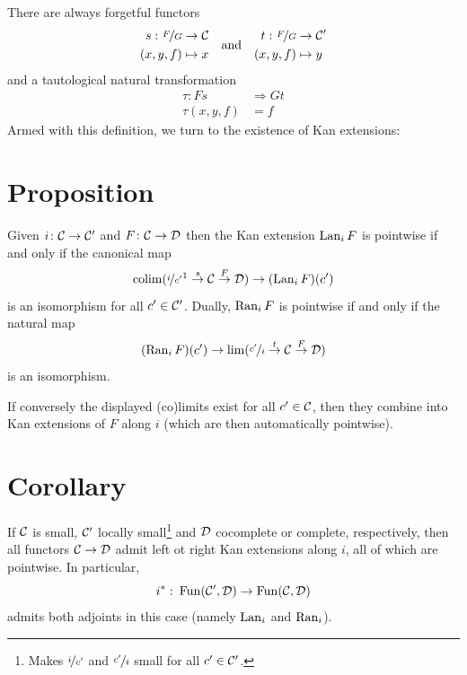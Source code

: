         There are always forgetful functors
        \begin{equation*}
            \begin{alignedat}{1}
                s \,\colon \nicefrac{F}{G} &\to \mathcal{C} \\
                (x,y,f) &\mapsto x
            \end{alignedat}
            \quad \text{and} \quad
            \begin{alignedat}{1}
                t \,\colon \nicefrac{F}{G} &\to \mathcal{C}' \\
                (x,y,f) &\mapsto y
            \end{alignedat}
        \end{equation*}
        and a tautological natural transformation
        \begin{equation*}
            \begin{alignedat}{1}
                \tau \colon Fs &\Rightarrow Gt \\
                \tau(x,y,f) &= f 
            \end{alignedat}
        \end{equation*}
        Armed with this definition, we turn to the existence of Kan extensions:
    \section{Proposition}\label{chI-44}
        Given $i \colon \mathcal{C} \to \mathcal{C}'$ and $F \colon \mathcal{C} \to \mathcal{D}$ then the Kan extension $\operatorname{Lan}_i F$ is pointwise if and only if the canonical map
        \begin{equation*}
            \colim(\nicefrac{i}{c'}\footnotemark \overset{s}{\rightarrow} \Cc \overset{F}{\rightarrow} \Dd) \to (\Lan_i F)(c')
        \end{equation*}
        is an isomorphism for all $c' \in \mathcal{C}'$. Dually, $\operatorname{Ran}_i F$ is pointwise if and only if the natural map
        \begin{equation*}
            (\operatorname{Ran}_i F)(c') \to \lim(\nicefrac{c'}{i} \overset{t}{\rightarrow} \mathcal{C} \overset{F}{\rightarrow} \mathcal{D})
        \end{equation*}
        is an isomorphism.

        If conversely the displayed (co)limits exist for all $c' \in \mathcal{C}$, then they combine into Kan extensions of $F$ along $i$ (which are then automatically pointwise).
    \section{Corollary}\label{chI-45}
        If $\mathcal{C}$ is small, $\mathcal{C}'$ locally small\footnote{Makes $\nicefrac{i}{c'}$ and $\nicefrac{c'}{i}$ small for all $c' \in \mathcal{C}'$.} and $\mathcal{D}$ cocomplete or complete, respectively, then all functors $\mathcal{C} \to \mathcal{D}$ admit left ot right Kan extensions along $i$, all of which are pointwise. In particular,
        \begin{equation*}
            i^* \,\colon \operatorname{Fun}(\mathcal{C}', \mathcal{D}) \to \operatorname{Fun}(\mathcal{C}, \mathcal{D})
        \end{equation*}
        admits both adjoints in this case (namely $\operatorname{Lan}_i$ and $\operatorname{Ran}_i$).
